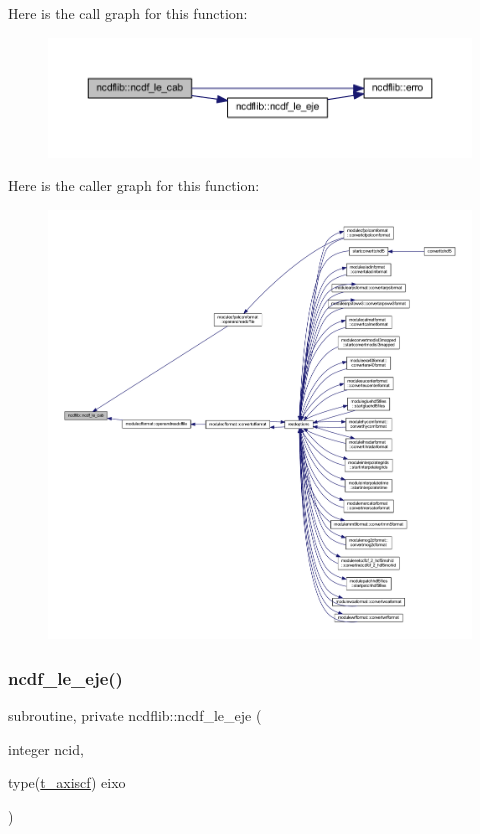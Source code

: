 Here is the call graph for this function\+:\nopagebreak
\begin{figure}[H]
\begin{center}
\leavevmode
\includegraphics[width=350pt]{namespacencdflib_a92c4f01a8b6a24a838eab2dc25d7d062_cgraph}
\end{center}
\end{figure}
Here is the caller graph for this function\+:\nopagebreak
\begin{figure}[H]
\begin{center}
\leavevmode
\includegraphics[width=350pt]{namespacencdflib_a92c4f01a8b6a24a838eab2dc25d7d062_icgraph}
\end{center}
\end{figure}
\mbox{\label{namespacencdflib_a6381f85426e3ba879b031f6feae929c1}} 
\subsubsection{\texorpdfstring{ncdf\+\_\+le\+\_\+eje()}{ncdf\_le\_eje()}}
{\footnotesize\ttfamily subroutine, private ncdflib\+::ncdf\+\_\+le\+\_\+eje (\begin{DoxyParamCaption}\item[{integer}]{ncid,  }\item[{type(\mbox{\hyperlink{structncdflib_1_1t__axiscf}{t\+\_\+axiscf}})}]{eixo }\end{DoxyParamCaption})\hspace{0.3cm}{\ttfamily [private]}}

